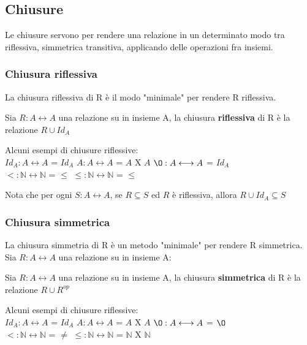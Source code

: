 \subsection{Chiusure}
Le chiusure servono per rendere una relazione in un determinato modo tra riflessiva, simmetrica transitiva, applicando delle operazioni fra insiemi.
\subsubsection{Chiusura riflessiva}
La chiusura riflessiva di R è il modo "minimale" per rendere R riflessiva.
\begin{definition}
    Sia $R: A \longleftrightarrow A$ una relazione su in insieme A, la chiusura \textbf{riflessiva} di R è la relazione $R \cup Id_A$
\end{definition}
\begin{example}
Alcuni esempi di chiusure riflessive:\\
$Id_A: A \longleftrightarrow A$ = $Id_A$ \hspace{.7cm} $A: A \longleftrightarrow A$ = $A$ X $A$ \hspace{.7cm} $\O: A \longleftrightarrow A$ = $Id_A$ \\$<: \mathbb{N} \longleftrightarrow \mathbb{N}$ = $\leq$  \hspace{.7cm} $\leq: \mathbb{N} \longleftrightarrow \mathbb{N}$ = $\leq$
\end{example}
\begin{note}
Nota che per ogni $S: A \longleftrightarrow A$, se $R \subseteq S$ ed $R$ è riflessiva, allora $R \cup Id_A \subseteq S$ 
\end{note}

\subsubsection{Chiusura simmetrica}
La chiusura simmetria di R è un metodo "minimale" per rendere R simmetrica.
Sia $R: A \longleftrightarrow A$ una relazione su in insieme A:
\begin{definition}
    Sia $R: A \longleftrightarrow A$ una relazione su in insieme A, la chiusura \textbf{simmetrica} di R è la relazione $R \cup R^{op}$
\end{definition}
\begin{example}
Alcuni esempi di chiusure riflessive:\\
$Id_A: A \longleftrightarrow A$ = $Id_A$ \hspace{.7cm} $A: A \longleftrightarrow A$ = $A$ X $A$ \hspace{.7cm} $\O: A \longleftrightarrow A$ = $\O$ \\$<: \mathbb{N} \longleftrightarrow \mathbb{N}$ = $\neq$  \hspace{.7cm} $\leq: \mathbb{N} \longleftrightarrow \mathbb{N}$ = $\mathbb{N}$ X $\mathbb{N}$
\end{example}

